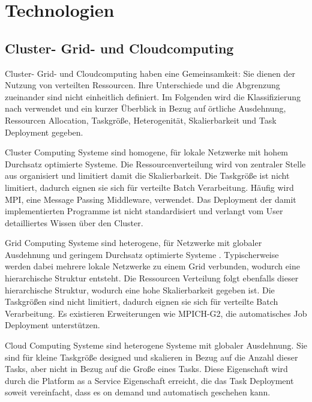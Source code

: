 \section{Technologien}


\subsection{Cluster- Grid- und Cloudcomputing}
Cluster- Grid- und Cloudcomputing haben eine Gemeinsamkeit:
Sie dienen der Nutzung von verteilten Ressourcen.
Ihre Unterschiede und die Abgrenzung zueinander sind nicht einheitlich definiert.
Im Folgenden wird die Klassifizierung nach \cite{sadashiv2011cluster} verwendet und ein kurzer Überblick in Bezug auf örtliche Ausdehnung, Ressourcen Allocation, Taskgröße, Heterogenität, Skalierbarkeit und Task Deployment gegeben.

Cluster Computing Systeme sind homogene, für lokale Netzwerke mit hohem Durchsatz optimierte Systeme.
Die Ressourcenverteilung wird von zentraler Stelle aus organisiert und limitiert damit die Skalierbarkeit.
Die Taskgröße ist nicht limitiert, dadurch eignen sie sich für verteilte Batch Verarbeitung.
Häufig wird MPI, eine Message Passing Middleware, verwendet.
Das Deployment der damit implementierten Programme ist nicht standardisiert und verlangt vom User detailliertes Wissen über den Cluster.

Grid Computing Systeme sind heterogene, für Netzwerke mit globaler Ausdehnung und geringem Durchsatz optimierte Systeme \cite{foster2003grid, foster2006grid}.
Typischerweise werden dabei mehrere lokale Netzwerke zu einem Grid verbunden, wodurch eine hierarchische Struktur entsteht.
Die Ressourcen Verteilung folgt ebenfalls dieser hierarchische Struktur, wodurch eine hohe Skalierbarkeit gegeben ist.
Die Taskgrößen sind nicht limitiert, dadurch eignen sie sich für verteilte Batch Verarbeitung.
Es existieren Erweiterungen wie MPICH-G2, die automatisches Job Deployment unterstützen.

Cloud Computing Systeme sind heterogene Systeme mit globaler Ausdehnung.
Sie sind für kleine Taskgröße designed und skalieren in Bezug auf die Anzahl dieser Tasks, aber nicht in Bezug auf die Große eines Tasks.
Diese Eigenschaft wird durch die Platform as a Service Eigenschaft erreicht, die das Task Deployment soweit vereinfacht, dass es on demand und automatisch geschehen kann.





